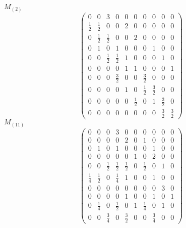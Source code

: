 \documentclass[12pt,reqno]{amsart}
\begin{document}
\Large
$M_{(2)}$                             $$ \begin{pmatrix} 
         0 & 0 & 3 & 0 & 0 & 0 & 0 & 0 & 0 & 0 \\[6pt]
 \frac{1}{2} &  \frac{1}{2} & 0 & 0 & 2 & 0 & 0 & 0 & 0 & 0 

  \\[6pt]

0 &  \frac{1}{2} &  \frac{1}{2} & 0 & 0 & 2 & 0 & 0 & 0 & 0 

  \\[6pt]

         0 & 1 & 0 & 1 & 0 & 0 & 0 & 1 & 0 & 0 \\[6pt]
0 & 0 &  \frac{1}{2} &  \frac{1}{2} & 1 & 0 & 0 & 0 & 1 & 0 

  \\[6pt]

         0 & 0 & 0 & 0 & 1 & 1 & 0 & 0 & 0 & 1 \\[6pt]
0 & 0 & 0 &  \frac{3}{2} & 0 & 0 &  \frac{3}{2} & 0 & 0 & 0 

  \\[6pt]

0 & 0 & 0 & 0 & 1 & 0 &  \frac{1}{2} &  \frac{3}{2} & 0 & 0 

  \\[6pt]

0 & 0 & 0 & 0 & 0 &  \frac{1}{2} & 0 & 1 &  \frac{3}{2} & 0 

  \\[6pt]

0 & 0 & 0 & 0 & 0 & 0 & 0 & 0 &  \frac{3}{2} &  \frac{3}{2}
                              \end{pmatrix} $$ 
$M_{(11)}$                             $$ \begin{pmatrix} 
         0 & 0 & 0 & 3 & 0 & 0 & 0 & 0 & 0 & 0 \\[6pt]
         0 & 0 & 0 & 0 & 2 & 0 & 1 & 0 & 0 & 0 \\[6pt]
         0 & 1 & 0 & 1 & 0 & 0 & 0 & 1 & 0 & 0 \\[6pt]
         0 & 0 & 0 & 0 & 0 & 1 & 0 & 2 & 0 & 0 \\[6pt]
    0 & 0 &  \frac{1}{2} &  \frac{1}{2} &  \frac{1}{2} & 0 & 

       \frac{1}{2} & 0 & 1 & 0 \\[6pt]

 \frac{1}{4} &  \frac{1}{2} & 0 &  \frac{1}{4} & 1 & 0 & 0 & 1 

  & 0 & 0 \\[6pt]

         0 & 0 & 0 & 0 & 0 & 0 & 0 & 0 & 3 & 0 \\[6pt]
         0 & 0 & 0 & 0 & 1 & 0 & 0 & 1 & 0 & 1 \\[6pt]
0 &  \frac{1}{4} & 0 &  \frac{1}{2} & 0 & 1 &  \frac{1}{4} & 0 

  & 1 & 0 \\[6pt]

0 & 0 &  \frac{3}{4} & 0 &  \frac{3}{2} & 0 & 0 &  \frac{3}{4} 

  & 0 & 0

                              \end{pmatrix} $$ 
\end{document}
